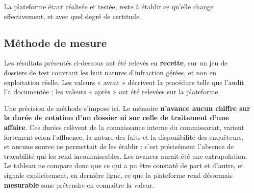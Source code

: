 La plateforme étant réalisée et testée, reste à établir ce qu'elle change effectivement, et avec quel degré de certitude.

\subsection{Méthode de mesure}

Les résultats présentés ci-dessous ont été relevés en \textbf{recette}, sur un jeu de dossiers de test couvrant les huit natures d'infraction gérées, et non en exploitation réelle. Les valeurs « avant » décrivent la procédure telle que l'audit l'a documentée ; les valeurs « après » ont été relevées sur la plateforme.

Une précision de méthode s'impose ici. Le mémoire \textbf{n'avance aucun chiffre sur la durée de cotation d'un dossier ni sur celle de traitement d'une affaire}. Ces durées relèvent de la connaissance interne du commissariat, varient fortement selon l'affluence, la nature des faits et la disponibilité des enquêteurs, et aucune source ne permettait de les établir : c'est précisément l'absence de traçabilité qui les rend inconnaissables. Les avancer aurait été une extrapolation. Le tableau ne compare donc que ce qui a pu être constaté de part et d'autre, et signale explicitement, en dernière ligne, ce que la plateforme rend désormais \textbf{mesurable} sans prétendre en connaître la valeur.

